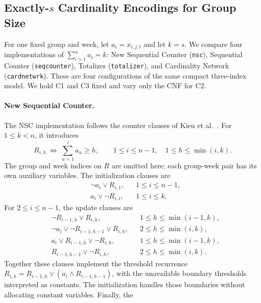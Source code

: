 \documentclass[a4paper,fleqn]{cas-sc}
\begin{document}
\subsection{Exactly-$s$ Cardinality Encodings for Group Size}
\label{sec:c2_encodings}

For one fixed group and week, let $a_i=x_{i,j,t}$ and let $k=s$.
We compare four implementations of $\sum_{i=1}^{n}a_i=k$: New
Sequential Counter (\texttt{nsc}), Sequential Counter
(\texttt{seqcounter}), Totalizer (\texttt{totalizer}), and Cardinality
Network (\texttt{cardnetwrk}). These are four configurations of the same
compact three-index model. We hold C1 and C3 fixed and vary only the CNF for C2.

\paragraph{New Sequential Counter.}
The NSC implementation follows the counter clauses of
Kieu et al.~\cite{kieu2025nse}. For $1\leq k<n$, it introduces
\begin{equation}
 R_{i,h}\ \Longleftrightarrow\
 \sum_{u=1}^{i}a_u\geq h,
 \qquad
 1\leq i\leq n-1,\quad 1\leq h\leq\min(i,k).
 \label{eq:nsc-meaning}
\end{equation}
The group and week indices on $R$ are omitted here; each group-week pair
has its own auxiliary variables. The initialization clauses are
\begin{align}
 &\neg a_i\lor R_{i,1}, &&1\leq i\leq n-1,
 \label{eq:nsc-init-one}\\
 &a_i\lor\neg R_{i,i}, &&1\leq i\leq k.
 \label{eq:nsc-init-diagonal}
\end{align}
For $2\leq i\leq n-1$, the update clauses are
\begin{align}
 &\neg R_{i-1,h}\lor R_{i,h},
 &&1\leq h\leq\min(i-1,k),
 \label{eq:nsc-forward}\\
 &\neg a_i\lor\neg R_{i-1,h-1}\lor R_{i,h},
 &&2\leq h\leq\min(i,k),
 \label{eq:nsc-increment}\\
 &a_i\lor R_{i-1,h}\lor\neg R_{i,h},
 &&1\leq h\leq\min(i-1,k),
 \label{eq:nsc-false-input}\\
 &R_{i-1,h-1}\lor\neg R_{i,h},
 &&2\leq h\leq\min(i,k).
 \label{eq:nsc-reverse}
\end{align}
Together these clauses implement the threshold recurrence
$R_{i,h}=R_{i-1,h}\lor(a_i\land R_{i-1,h-1})$, with the unavailable
boundary thresholds interpreted as constants. The initialization handles
those boundaries without allocating constant variables. Finally, the
\end{document}
